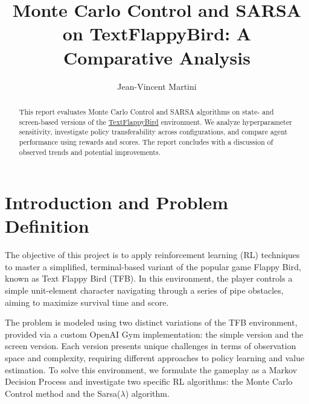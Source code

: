 \documentclass[runningheads]{llncs}
\begin{document}
\title{Monte Carlo Control and SARSA on TextFlappyBird: A Comparative Analysis}

\author{Jean-Vincent Martini}


 
\maketitle   

\vspace*{-0.7cm}

\begin{abstract}
This report evaluates Monte Carlo Control and SARSA algorithms on state- and screen-based versions of the \href{https://gitlab-research.centralesupelec.fr/stergios.christodoulidis/text-flappy-bird-gym}{TextFlappyBird} environment. We analyze hyperparameter sensitivity, investigate policy transferability across configurations, and compare agent performance using rewards and scores. The report concludes with a discussion of observed trends and potential improvements.

\end{abstract}
%
%
\vspace*{-0.7cm}

\section{Introduction and Problem Definition}

The objective of this project is to apply reinforcement learning (RL) techniques to master a simplified, terminal-based variant of the popular game Flappy Bird, known as Text Flappy Bird (TFB). In this environment, the player controls a simple unit-element character navigating through a series of pipe obstacles, aiming to maximize survival time and score. 

The problem is modeled using two distinct variations of the TFB environment, provided via a custom OpenAI Gym implementation: the simple version and the screen  version. Each version presents unique challenges in terms of observation space and complexity, requiring different approaches to policy learning and value estimation. To solve this environment, we formulate the gameplay as a Markov Decision Process and investigate two specific RL algorithms: the Monte Carlo Control method and the Sarsa($\lambda$) algorithm.
\end{document}
